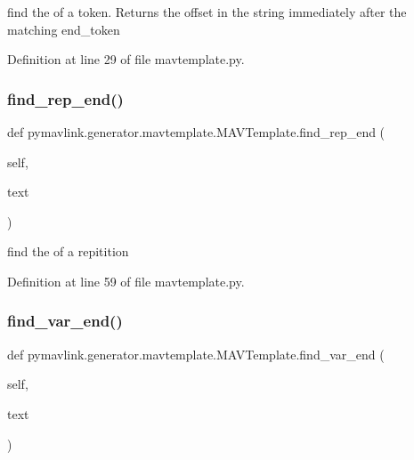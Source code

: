 \begin{DoxyVerb}find the of a token.
Returns the offset in the string immediately after the matching end_token\end{DoxyVerb}
 

Definition at line 29 of file mavtemplate.\+py.

\mbox{\label{classpymavlink_1_1generator_1_1mavtemplate_1_1MAVTemplate_ac653ff2519c9aa35c4ae2df3f97114c5}} 
\subsubsection{\texorpdfstring{find\_rep\_end()}{find\_rep\_end()}}
{\footnotesize\ttfamily def pymavlink.\+generator.\+mavtemplate.\+M\+A\+V\+Template.\+find\+\_\+rep\+\_\+end (\begin{DoxyParamCaption}\item[{}]{self,  }\item[{}]{text }\end{DoxyParamCaption})}

\begin{DoxyVerb}find the of a repitition\end{DoxyVerb}
 

Definition at line 59 of file mavtemplate.\+py.

\mbox{\label{classpymavlink_1_1generator_1_1mavtemplate_1_1MAVTemplate_a627b9f64b13bece04d2711ce25beaba2}} 
\subsubsection{\texorpdfstring{find\_var\_end()}{find\_var\_end()}}
{\footnotesize\ttfamily def pymavlink.\+generator.\+mavtemplate.\+M\+A\+V\+Template.\+find\+\_\+var\+\_\+end (\begin{DoxyParamCaption}\item[{}]{self,  }\item[{}]{text }\end{DoxyParamCaption})}

